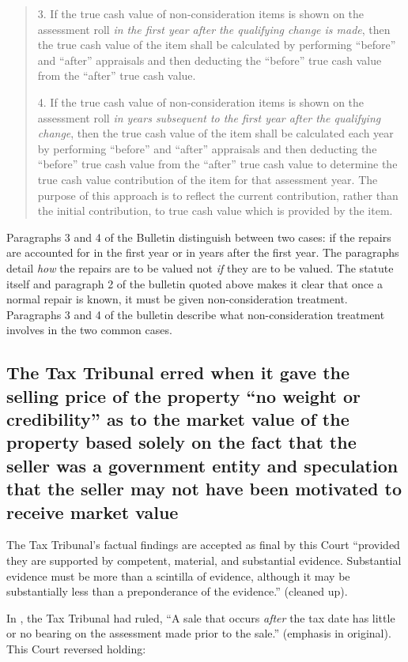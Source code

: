 \documentclass[12pt,\documentclassflag]{michiganCourtOfAppealsBrief}
\begin{document}
\begin{quotation}
3. If the true cash value of non-consideration items is shown on the assessment roll \textit{in the first year after the qualifying change is made}, then the true cash value of the item shall be calculated by performing ``before'' and ``after'' appraisals and then deducting the ``before'' true cash value from the ``after'' true cash value.

4. If the true cash value of non-consideration items is shown on the assessment roll \textit{in years subsequent to the first year after the qualifying change}, then the true cash value of the item shall be calculated each year by performing ``before'' and ``after'' appraisals and then deducting the ``before'' true cash value from the ``after'' true cash value to determine the true cash value contribution of the item for that assessment year. The purpose of this approach is to reflect the current contribution, rather than the initial contribution, to true cash value which is provided by the item.
\end{quotation}

Paragraphs 3 and 4 of the Bulletin distinguish between two cases: if the repairs are accounted for in the first year or in years after the first year. The paragraphs detail \textit{how} the repairs are to be valued not \textit{if} they are to be valued. The statute itself and paragraph 2 of the bulletin quoted above makes it clear that once a normal repair is known, it must be given non-consideration treatment. Paragraphs 3 and 4 of the bulletin describe what non-consideration treatment involves in the two common cases.

\subsection{The Tax Tribunal erred when it gave the selling price of the property ``no weight or credibility'' as to the market value of the property based solely on the fact that the seller was a government entity and speculation that the seller may not have been motivated to receive market value}

The Tax Tribunal's factual findings are accepted as final by this Court ``provided they are supported by competent, material, and substantial evidence. Substantial evidence must be more than a scintilla of evidence, although it may be substantially less than a preponderance of the evidence.''  (cleaned up).

In \cite[s]{Jones & Laughlin}, the Tax Tribunal had ruled, ``A sale that occurs \textit{after} the tax date has little or no bearing on the assessment made prior to the sale.''  (emphasis in original). This Court reversed holding: 
\end{document}
